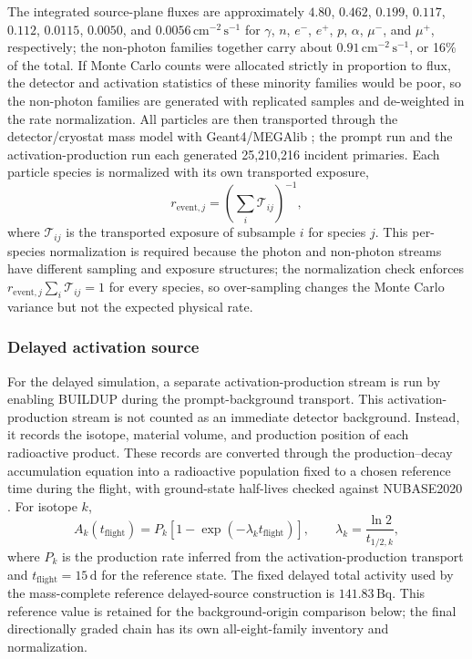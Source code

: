 \documentclass[11pt]{article}
\begin{document}
The integrated source-plane fluxes are approximately $4.80$, $0.462$, $0.199$,
$0.117$, $0.112$, $0.0115$, $0.0050$, and $0.0056\,\mathrm{cm^{-2}\,s^{-1}}$
for $\gamma$, $n$, $e^-$, $e^+$, $p$, $\alpha$, $\mu^-$, and $\mu^+$,
respectively; the non-photon families together carry about
$0.91\,\mathrm{cm^{-2}\,s^{-1}}$, or 16\% of the total. If Monte Carlo counts
were allocated strictly in proportion to flux, the detector and activation
statistics of these minority families would be poor, so the non-photon
families are generated with replicated samples and de-weighted in the rate
normalization. All particles are then transported through the
detector/cryostat mass model with Geant4/MEGAlib
\cite{Agostinelli2003,Allison2016,Zoglauer2006}; the prompt run and the
activation-production run each generated 25,210,216 incident primaries. Each
particle species is normalized with its own transported exposure,
\begin{equation}
  r_{\mathrm{event},j}=\left(\sum_i \mathcal{T}_{ij}\right)^{-1},
\end{equation}
where $\mathcal{T}_{ij}$ is the transported exposure of subsample $i$ for
species $j$. This per-species normalization is required because the photon and
non-photon streams have different sampling and exposure structures; the
normalization check enforces $r_{\mathrm{event},j}\sum_i\mathcal{T}_{ij}=1$
for every species, so over-sampling changes the Monte Carlo variance but not
the expected physical rate.

\subsubsection{Delayed activation source}
\label{subsec:delayed_source}

For the delayed simulation, a separate activation-production stream is run by
enabling BUILDUP during the prompt-background transport. This
activation-production stream is not counted as an immediate detector background.
Instead, it records the isotope, material volume, and production position of
each radioactive product. These records are converted through the
production--decay accumulation equation into a radioactive population fixed to a
chosen reference time during the flight, with ground-state half-lives checked
against NUBASE2020 \cite{Kondev2021NUBASE}. For isotope $k$,
\begin{equation}
  A_k(t_{\mathrm{flight}}) = P_k\left[1-\exp\left(-\lambda_k t_{\mathrm{flight}}\right)\right],
  \qquad \lambda_k = \frac{\ln 2}{t_{1/2,k}},
\end{equation}
where $P_k$ is the production rate inferred from the activation-production
transport and $t_{\mathrm{flight}}=15\,\mathrm{d}$ for the reference state.
The fixed delayed total activity used by the mass-complete reference
delayed-source construction is $141.83\,\mathrm{Bq}$. This reference value is
retained for the background-origin comparison below; the final directionally graded chain has
its own all-eight-family inventory and normalization.
\end{document}
